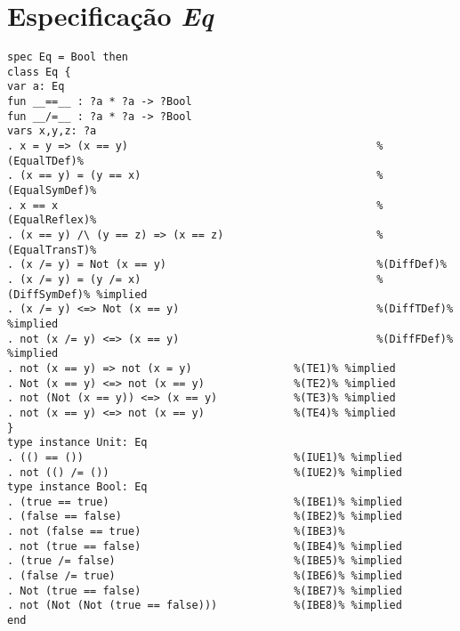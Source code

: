 \section{Especificação \textit{Eq}}
\label{appendix:lazySpec:eq}
\begin{Verbatim}
spec Eq = Bool then
class Eq {
var a: Eq
fun __==__ : ?a * ?a -> ?Bool
fun __/=__ : ?a * ?a -> ?Bool
vars x,y,z: ?a
. x = y => (x == y)                                       %(EqualTDef)%
. (x == y) = (y == x)                                     %(EqualSymDef)%
. x == x                                                  %(EqualReflex)%
. (x == y) /\ (y == z) => (x == z)                        %(EqualTransT)%
. (x /= y) = Not (x == y)                                 %(DiffDef)%
. (x /= y) = (y /= x)                                     %(DiffSymDef)% %implied
. (x /= y) <=> Not (x == y)                               %(DiffTDef)% %implied
. not (x /= y) <=> (x == y)                               %(DiffFDef)% %implied
. not (x == y) => not (x = y)                %(TE1)% %implied
. Not (x == y) <=> not (x == y)              %(TE2)% %implied
. not (Not (x == y)) <=> (x == y)            %(TE3)% %implied
. not (x == y) <=> not (x == y)              %(TE4)% %implied
}
type instance Unit: Eq
. (() == ())                                 %(IUE1)% %implied
. not (() /= ())                             %(IUE2)% %implied
type instance Bool: Eq
. (true == true)                             %(IBE1)% %implied
. (false == false)                           %(IBE2)% %implied
. not (false == true)                        %(IBE3)%
. not (true == false)                        %(IBE4)% %implied
. (true /= false)                            %(IBE5)% %implied
. (false /= true)                            %(IBE6)% %implied
. Not (true == false)                        %(IBE7)% %implied
. not (Not (Not (true == false)))            %(IBE8)% %implied
end
\end{Verbatim}

